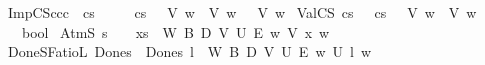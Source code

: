 \begin{isabellebody}
\ ImpCS{\isacharcolon}{\kern0pt}{\isacharcolon}{\kern0pt}{\isachardoublequoteopen}{\isasymsigma}\isactrlsub c{\isasymRightarrow}{\isasymsigma}\isactrlsub c{\isasymRightarrow}{\isasymsigma}\isactrlsub c{\isachardoublequoteclose}\ {\isacharparenleft}{\kern0pt}\ {\isachardoublequoteopen}{\isasymsupset}\isactrlsup c\isactrlsup s{\isachardoublequoteclose}\ {}{}{\isacharparenright}{\kern0pt}\ \isanewline
\ \ {\isachardoublequoteopen}{\isasymphi}\ {\isasymsupset}\isactrlsup c\isactrlsup s\ {\isasympsi}\ {\isasymequiv}\ {\isasymlambda}V\ w{\isachardot}{\kern0pt}\ {\isasymphi}\ V\ w\ {\isasymlongrightarrow}\ {\isasympsi}\ V\ w{\isachardoublequoteclose}\isanewline
{}\isamarkupfalse%
\ ValCS\ {\isacharparenleft}{\kern0pt}{\isachardoublequoteopen}{\isasymTurnstile}\isactrlsup c\isactrlsup s\ {\isacharunderscore}{\kern0pt}{\isachardoublequoteclose}{\isacharparenright}{\kern0pt}\ \ {\isachardoublequoteopen}{\isasymTurnstile}\isactrlsup c\isactrlsup s\ {\isasymphi}\ {\isasymequiv}\ {\isasymforall}V\ w{\isachardot}{\kern0pt}\ {\isasymphi}\ V\ w{\isachardoublequoteclose}\isanewline
\isanewline
{}\isamarkupfalse%
\ {\isasymsigma}\ {\isacharequal}{\kern0pt}\ {\isachardoublequoteopen}{\isasymW}{\isasymRightarrow}{\isasymR}{\isasymRightarrow}{\isasymR}{\isasymRightarrow}{\isasymV}{\isasymRightarrow}{\isasymU}{\isasymRightarrow}{\isasymE}{\isasymRightarrow}{\isasymw}{\isasymRightarrow}bool{\isachardoublequoteclose}\isanewline
\isanewline
{}\isamarkupfalse%
\ AtmS{\isacharcolon}{\kern0pt}{\isacharcolon}{\kern0pt}{\isachardoublequoteopen}{\isasymS}{\isasymRightarrow}{\isasymsigma}{\isachardoublequoteclose}\ {\isacharparenleft}{\kern0pt}{\isachardoublequoteopen}{\isacharunderscore}{\kern0pt}\isactrlsup s{\isachardoublequoteclose}\ {\isacharbrackleft}{\kern0pt}{}{}{}{}{\isacharbrackright}{\kern0pt}\ {}{}{}{\isacharparenright}{\kern0pt}\ \ {\isachardoublequoteopen}x\isactrlsup s\ {\isasymequiv}\ {\isasymlambda}W\ B\ D\ V\ U\ E\ w{\isachardot}{\kern0pt}\ V\ x\ w{\isachardoublequoteclose}\isanewline
{}\isamarkupfalse%
\ DoneS{\isacharcolon}{\kern0pt}{\isacharcolon}{\kern0pt}{\isachardoublequoteopen}FatioL{\isasymRightarrow}{\isasymsigma}{\isachardoublequoteclose}\ {\isacharparenleft}{\kern0pt}{\isachardoublequoteopen}Done\isactrlsup s{\isachardoublequoteclose}{\isacharparenright}{\kern0pt}\ \ {\isachardoublequoteopen}Done\isactrlsup s\ l\ {\isasymequiv}\ {\isasymlambda}W\ B\ D\ V\ U\ E\ w{\isachardot}{\kern0pt}\ U\ l\ w{\isachardoublequoteclose}\isanewline

\end{isabellebody}
